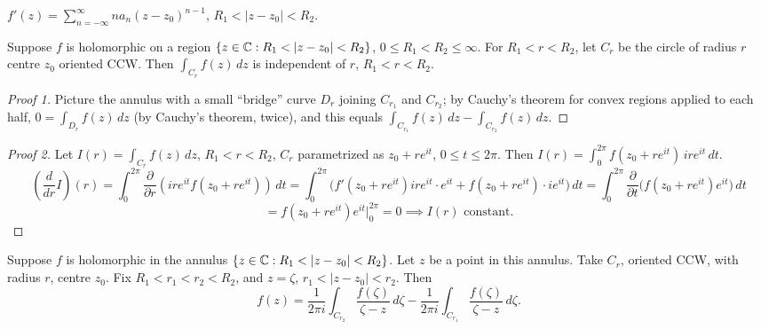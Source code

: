 \documentclass[11pt]{article}
\begin{document}
\begin{remark}
$f'(z) = \sum_{n=-\infty}^\infty na_n(z-z_0)^{n-1}$, $R_1<|z-z_0|<R_2$.
\end{remark}

\begin{theorem}
Suppose $f$ is holomorphic on a region $\{z\in{\mathbb{C}} : R_1 < |z-z_0| < R_2\}$, $0\le R_1<R_2\le\infty$. For $R_1<r<R_2$, let $C_r$ be the circle of radius $r$ centre $z_0$ oriented CCW. Then $\int_{C_r} f(z)\,dz$ is independent of $r$, $R_1<r<R_2$.
\end{theorem}

\begin{proof}[Proof 1]
Picture the annulus with a small ``bridge'' curve $D_r$ joining $C_{r_1}$ and $C_{r_2}$; by Cauchy's theorem for convex regions applied to each half, $0 = \int_{D_r} f(z)\,dz$ (by Cauchy's theorem, twice), and this equals $\int_{C_{r_1}} f(z)\,dz - \int_{C_{r_2}} f(z)\,dz$.
\end{proof}

\begin{proof}[Proof 2]
Let $I(r) = \int_{C_r} f(z)\,dz$, $R_1<r<R_2$, $C_r$ parametrized as $z_0+re^{it}$, $0\le t\le2\pi$. Then $I(r) = \int_0^{2\pi} f(z_0+re^{it})\,ire^{it}\,dt$.
\[
\left(\frac{d}{dr}I\right)(r) = \int_0^{2\pi} \frac{\partial}{\partial r}(ire^{it}f(z_0+re^{it}))\,dt = \int_0^{2\pi} \big(f'(z_0+re^{it})ire^{it}\cdot e^{it} + f(z_0+re^{it})\cdot ie^{it}\big)\,dt = \int_0^{2\pi} \frac{\partial}{\partial t}\big(f(z_0+re^{it})e^{it}\big)\,dt
\]
\[
= f(z_0+re^{it})e^{it}\Big|_0^{2\pi} = 0 \implies I(r) \text{ constant}.
\]
\end{proof}

\begin{theorem}
Suppose $f$ is holomorphic in the annulus $\{z\in\C : R_1<|z-z_0|<R_2\}$. Let $z$ be a point in this annulus. Take $C_r$, oriented CCW, with radius $r$, centre $z_0$. Fix $R_1<r_1<r_2<R_2$, and $z=\zeta$, $r_1<|z-z_0|<r_2$. Then
\[
f(z) = \frac{1}{2\pi i}\int_{C_{r_2}} \frac{f(\zeta)}{\zeta-z}\,d\zeta - \frac{1}{2\pi i}\int_{C_{r_1}} \frac{f(\zeta)}{\zeta-z}\,d\zeta.
\]
\end{theorem}
\end{document}
